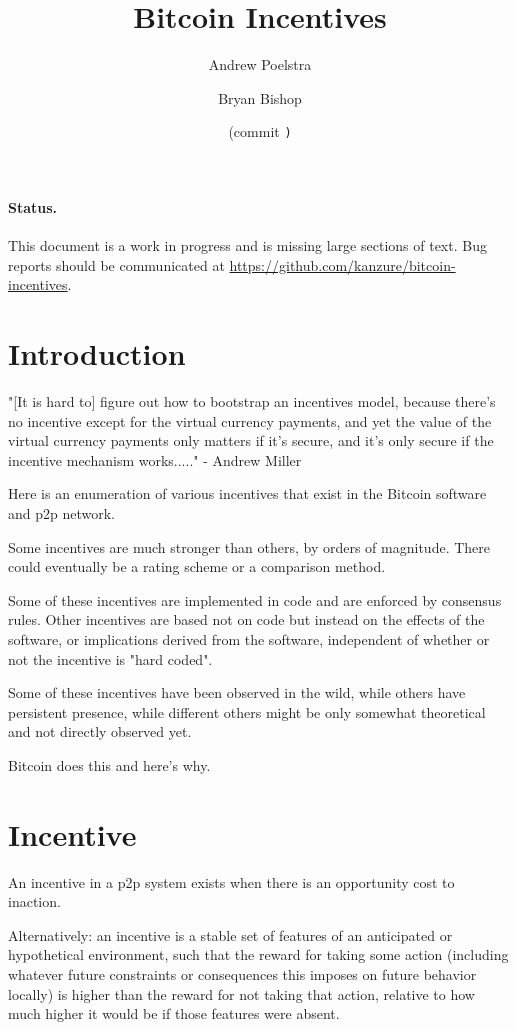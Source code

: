 \documentclass[letterpaper]{article}
\title{Bitcoin Incentives}
\author{Andrew Poelstra}
\author{Bryan Bishop}
\date{\gitAuthorDate{} (commit \texttt{\gitAbbrevHash)}}
\begin{document}
\maketitle

\paragraph{Status.} This document is a work in progress and is missing large
sections of text. Bug reports should be communicated at
\url{https://github.com/kanzure/bitcoin-incentives}.

\section{Introduction}

"[It is hard to] figure out how to bootstrap an incentives model, because
there's no incentive except for the virtual currency payments, and yet the
value of the virtual currency payments only matters if it's secure, and it's
only secure if the incentive mechanism works....." - Andrew Miller

Here is an enumeration of various incentives that exist in the Bitcoin software
and p2p network.

Some incentives are much stronger than others, by orders of magnitude. There
could eventually be a rating scheme or a comparison method.

Some of these incentives are implemented in code and are enforced by consensus
rules. Other incentives are based not on code but instead on the effects of the
software, or implications derived from the software, independent of whether or
not the incentive is "hard coded".

Some of these incentives have been observed in the wild, while others have
persistent presence, while different others might be only somewhat theoretical
and not directly observed yet.

Bitcoin does this and here's why.

\section{Incentive}

An incentive in a p2p system exists when there is an opportunity cost to
inaction.

Alternatively: an incentive is a stable set of features of an anticipated or
hypothetical environment, such that the reward for taking some action
(including whatever future constraints or consequences this imposes on future
behavior locally) is higher than the reward for not taking that action,
relative to how much higher it would be if those features were absent.
\end{document}
